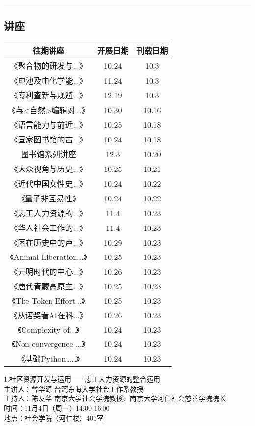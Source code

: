 \documentclass[letterpaper, 12pt]{article}
\begin{document}
\begin{multicols}{2}
{\begin{longtable}{|c|c|c|}
    \hline
\end{longtable}
\unskip
\unpenalty
\unpenalty}\unvbox\colbbox
\end{multicols}
\hrule
\pagebreak
\begin{multicols}{2}

\section{讲座}
\begin{tabular}{|c|c|c|}
    \hline
    往期讲座 & 开展日期 & 刊载日期\\
    \hline\hline
    《聚合物的研发与...》 & 10.24 & 10.3\\
    《电池及电化学能...》 & 11.24 & 10.3\\
    《专利查新与规避...》 & 12.19 & 10.3\\
    《与<自然>编辑对...》 & 10.30 & 10.16\\
    《语言能力与前近...》 & 10.25 & 10.18\\
    《国家图书馆的古...》 & 10.24 & 10.18\\
    图书馆系列讲座 & 12.3 & 10.20\\
    《大众视角与历史...》 & 10.25 & 10.21\\
    《近代中国女性史...》 & 10.24 & 10.22\\
    《量子非互易性》 & 10.24 & 10.22\\
    《志工人力资源的...》 & 11.4 & 10.23\\
    《华人社会工作的...》 & 11.4 & 10.23\\
    《困在历史中的卢...》 & 10.29 & 10.23\\
    《Animal Liberation...》 & 10.25 & 10.23\\
    《元明时代的中心...》 & 10.26 & 10.23\\
    《唐代青藏高原主...》 & 10.25 & 10.23\\
    《The Token-Effort...》 & 10.25 & 10.23\\
    《从诺奖看AI在科...》 & 10.26 & 10.23\\
    《Complexity of...》 & 10.24 & 10.23\\
    《Non-convergence ...》 & 10.24 & 10.23\\
    《基础Python……》 & 10.24 & 10.23\\
    \hline
\end{tabular}

1.社区资源开发与运用——志工人力资源的整合运用\\
主讲人：曾华源 台湾东海大学社会工作系教授\\
主持人：陈友华 南京大学社会学院教授、南京大学河仁社会慈善学院院长\\
时间：11月4日（周一）14:00-16:00\\
地点：社会学院（河仁楼）401室\\


\end{multicols}
\end{document}
